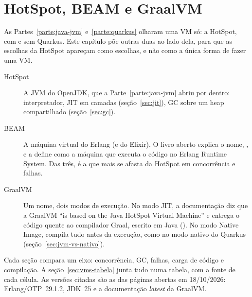\chapter{HotSpot, BEAM e GraalVM}
\label{cap:comparacao-vms}

\proximasaulas

As Partes~\ref{parte:java-jvm} e~\ref{parte:quarkus} olharam uma VM só: a HotSpot, com e sem Quarkus.
Este capítulo põe outras duas ao lado dela, para que as escolhas da
HotSpot apareçam como escolhas, e não como a única forma de fazer uma VM.

\begin{description}
\item[HotSpot] A JVM do OpenJDK, que a Parte~\ref{parte:java-jvm} abriu por dentro:
  interpretador, JIT em camadas (seção~\ref{sec:jit}), GC sobre um heap
  compartilhado (seção~\ref{sec:gc}).
\item[BEAM] A máquina virtual do Erlang (e do Elixir). O livro aberto
   explica o nome, , e a
  define como a máquina que executa o código no Erlang Runtime System.
  Das três, é a que mais se afasta da HotSpot em concorrência e falhas.
\item[GraalVM] Um nome, dois modos de execução. No modo JIT, a documentação
  diz que a GraalVM \enquote{is based on the Java HotSpot Virtual
  Machine} e entrega o código quente ao compilador Graal, escrito em Java
  (). No modo Native Image, compila tudo antes
  da execução, como no modo nativo do Quarkus
  (seção~\ref{sec:jvm-vs-nativo}).
\end{description}

Cada seção compara um eixo: concorrência, GC, falhas, carga de código e
compilação. A seção~\ref{sec:vms-tabela} junta tudo numa tabela, com a
fonte de cada célula. As versões citadas são as das páginas abertas em
18/10/2026: Erlang/OTP~29.1.2, JDK~25 e a documentação \emph{latest} da
GraalVM.









